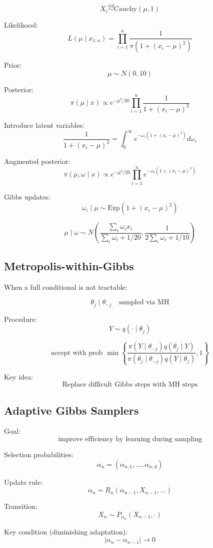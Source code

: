 \documentclass[12pt,oneside]{book}
\numberwithin{equation}{section}
\theoremstyle{definition}
\theoremstyle{plain}
\theoremstyle{remark}
\begin{document}
\[
X_i \stackrel{iid}{\sim} \text{Cauchy}(\mu,1)
\]

Likelihood:
\[
L(\mu \mid x_{1:n}) = \prod_{i=1}^n \frac{1}{\pi(1 + (x_i - \mu)^2)}
\]

Prior:
\[
\mu \sim N(0,10)
\]

Posterior:
\[
\pi(\mu \mid x) \propto e^{-\mu^2/20} \prod_{i=1}^n \frac{1}{1 + (x_i - \mu)^2}
\]

Introduce latent variables:
\[
\frac{1}{1 + (x_i - \mu)^2}
=
\int_0^\infty e^{-\omega_i(1 + (x_i - \mu)^2)} d\omega_i
\]

Augmented posterior:
\[
\pi(\mu, \omega \mid x)
\propto
e^{-\mu^2/20}
\prod_{i=1}^n e^{-\omega_i(1 + (x_i - \mu)^2)}
\]

Gibbs updates:
\[
\omega_i \mid \mu \sim \text{Exp}(1 + (x_i - \mu)^2)
\]

\[
\mu \mid \omega \sim N\left(
\frac{\sum_i \omega_i x_i}{\sum_i \omega_i + 1/20},
\frac{1}{2\sum_i \omega_i + 1/10}
\right)
\]

\subsection*{Metropolis-within-Gibbs}

When a full conditional is not tractable:

\[
\theta_j \mid \theta_{-j} \quad \text{sampled via MH}
\]

Procedure:
\[
Y \sim q(\cdot \mid \theta_j)
\]

\[
\text{accept with prob } \min\left\{
\frac{\pi(Y \mid \theta_{-j}) q(\theta_j \mid Y)}
{\pi(\theta_j \mid \theta_{-j}) q(Y \mid \theta_j)}, 1
\right\}
\]

Key idea:
\[
\text{Replace difficult Gibbs steps with MH steps}
\]

\subsection{Adaptive Gibbs Samplers}

Goal:
\[
\text{improve efficiency by learning during sampling}
\]

Selection probabilities:
\[
\alpha_n = (\alpha_{n,1}, \dots, \alpha_{n,d})
\]

Update rule:
\[
\alpha_n = R_n(\alpha_{n-1}, X_{n-1}, \dots)
\]

Transition:
\[
X_n \sim P_{\alpha_n}(X_{n-1}, \cdot)
\]

Key condition (diminishing adaptation):
\[
|\alpha_n - \alpha_{n-1}| \to 0
\]
\end{document}
